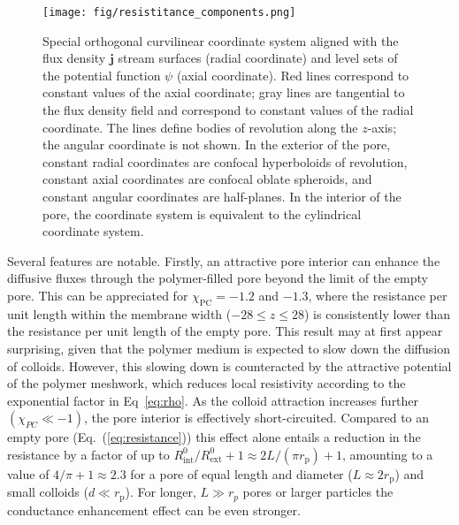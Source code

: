 \documentclass[12pt, a4paper]{article}
\begin{document}
\begin{figure}
    \centering
    \texttt{[image: fig/resistitance\_components.png]}
    \caption{
    Special orthogonal curvilinear coordinate system aligned with the flux density $\bm{j}$ stream surfaces (radial coordinate) and level sets of the potential function $\psi$ (axial coordinate).
    Red lines correspond to constant values of the axial coordinate; gray lines are tangential to the flux density field and correspond to constant values of the radial coordinate.
    The lines define bodies of revolution along the $z$-axis; the angular coordinate is not shown.
    In the exterior of the pore, constant radial coordinates are confocal hyperboloids of revolution, constant axial coordinates are confocal oblate spheroids, and constant angular coordinates are half-planes.
    In the interior of the pore, the coordinate system is equivalent to the cylindrical coordinate system.
    }
    \label{fig:resistivity_profile}
\end{figure}

Several features are notable. Firstly, an attractive pore interior can enhance the diffusive fluxes through the polymer-filled pore beyond the limit of the empty pore.
This can be appreciated for $\chi_{\text{PC}} = -1.2$ and $-1.3$, where the resistance per unit length within the membrane width ($-28 \leq z \leq 28$) is consistently lower than the resistance per unit length of the empty pore.
This result may at first appear surprising, given that the polymer medium is expected to slow down the diffusion of colloids.
However, this slowing down is counteracted by the attractive potential of the polymer meshwork, which reduces local resistivity according to the exponential factor in Eq~\ref{eq:rho}.
As the colloid attraction increases further $(\chi_{PC}\ll -1)$, the pore interior is effectively short-circuited.
Compared to an empty pore (Eq.~(\ref{eq:resistance})) this effect alone entails a reduction in the resistance by a factor of up to $R^0_{\text{int}}/R^0_{\text{ext}}+1 \approx 2L/(\pi r_{\text{p}})+1$, amounting to a value of $4/\pi+1 \approx 2.3$ for a pore of equal length and diameter ($L \approx 2r_{\text{p}}$) and small colloids ($d\ll r_{\text{p}}$). For longer, $L\gg r_p$ pores or larger particles the conductance enhancement  effect can be even stronger.
\end{document}
